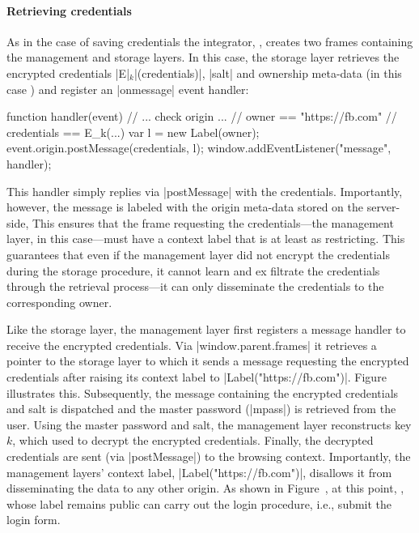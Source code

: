 \paragraph{Retrieving credentials}
%
As in the case of saving credentials the integrator, ,
creates two frames containing the management and storage layers.
%
In this case, the storage layer retrieves the encrypted credentials
\js|E|$_k$\js|(credentials)|, \js|salt| and ownership meta-data (in
this case ) and register an \js|onmessage| event
handler:
\begin{jscode}
function handler(event) {
  // ... check origin ...
  // owner == "https://fb.com"
  // credentials == E_k(...)
  var l = new Label(owner);
  event.origin.postMessage(credentials, l);
} 
window.addEventListener("message", handler);
\end{jscode}
This handler simply replies via \js|postMessage| with the credentials.
%
Importantly, however, the message is labeled with the origin meta-data
stored on the server-side, 
%
This ensures that the frame requesting the credentials---the
management layer, in this case---must have a context label that is at
least as restricting.
%
This guarantees that even if the management layer did not encrypt the
credentials during the storage procedure, it cannot learn and
ex filtrate the credentials through the retrieval process---it can
only disseminate the credentials to the corresponding owner.
%

Like the storage layer, the management layer first registers a message
handler to receive the encrypted credentials.
%
Via \js|window.parent.frames| it retrieves a pointer to the storage
layer to which it sends a message requesting the encrypted credentials
after raising its context label to \js|Label("https://fb.com")|.
%
Figure~ illustrates this.
%
Subsequently, the message containing the encrypted
credentials and salt is dispatched and the
master password (\js|mpass|) is retrieved from the user. 
%
Using the master password and salt, the management layer reconstructs
key $k$, which used to decrypt the encrypted credentials.
%
Finally, the decrypted credentials are sent (via \js|postMessage|) to
the  browsing context.
%
Importantly, the management layers' context label,
\js|Label("https://fb.com")|, disallows it from disseminating the data
to any other origin.
%
As shown in Figure~, at this point,
, whose label remains public can carry out the login
procedure, i.e., submit the login form.



